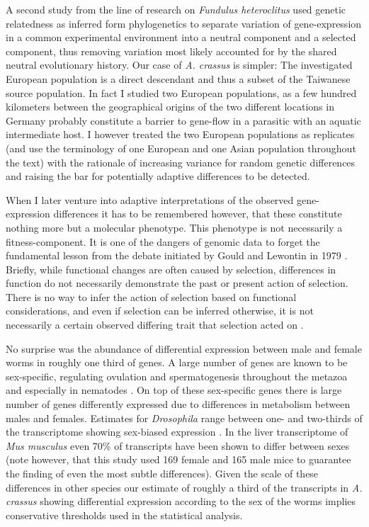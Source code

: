 A second study from the line of research on \textit{Fundulus
  heteroclitus} \cite{pmid16567645} used genetic relatedness as
inferred form phylogenetics to separate variation of gene-expression
in a common experimental environment into a neutral component and a
selected component, thus removing variation most likely accounted for
by the shared neutral evolutionary history. Our case of
\textit{A. crassus} is simpler: The investigated European population
is a direct descendant and thus a subset of the Taiwanese source
population. In fact I studied two European populations, as a few
hundred kilometers between the geographical origins of the two
different locations in Germany probably constitute a barrier to
gene-flow in a parasitic with an aquatic intermediate host. I however
treated the two European populations as replicates (and use the
terminology of one European and one Asian population throughout the
text) with the rationale of increasing variance for random genetic
differences and raising the bar for potentially adaptive differences
to be detected.

When I later venture into adaptive interpretations of the observed
gene-expression differences it has to be remembered however, that
these constitute nothing more but a molecular phenotype. This
phenotype is not necessarily a fitness-component. It is one of the
dangers of genomic data to forget the fundamental lesson from the
debate initiated by Gould and Lewontin in 1979
\cite{gould_spandrels_1979}. Briefly, while functional changes are
often caused by selection, differences in function do not necessarily
demonstrate the past or present action of selection. There is no way
to infer the action of selection based on functional considerations,
and even if selection can be inferred otherwise, it is not necessarily
a certain observed differing trait that selection acted on
\cite{pmid19744124}.

No surprise was the abundance of differential expression between male
and female worms in roughly one third of genes. A large number of genes
are known to be sex-specific, regulating ovulation and spermatogenesis
throughout the metazoa and especially in nematodes
\cite{pmid15371532}. On top of these sex-specific genes there is large
number of genes differently expressed due to differences in
metabolism between males and females. Estimates for
\textit{Drosophila} range between one- and two-thirds of the
transcriptome showing sex-biased expression \cite{pmid11726925}. In
the liver transcriptome of \textit{Mus musculus} even 70\% of
transcripts have been shown to differ between sexes
\cite{pmid16825664} (note however, that this study used 169 female and
165 male mice to guarantee the finding of even the most subtle
differences). Given the scale of these differences in other species
our estimate of roughly a third of the transcripts in
\textit{A. crassus} showing differential expression according to the
sex of the worms implies conservative thresholds used in the
statistical analysis.


